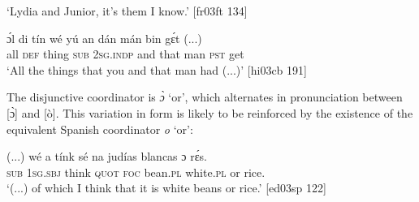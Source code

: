 \glt ‘Lydia and Junior, it’s them I know.’ [fr03ft 134]
\z


\ea%
    \label{ex:key:298}
    \gll ɔ́l  di  tín    wé  yú    an  dán  mán    bin  gɛ́t (...)\\
all  \textsc{def}  thing  \textsc{sub}  \textsc{2sg.indp}  and  that  man    \textsc{pst}  get\\

\glt ‘All the things that you and that man had (...)’ [hi03cb 191]
\z

The disjunctive coordinator is \textit{ɔ̀} ‘or’, which alternates in pronunciation between [ɔ̀] and [ò]. This variation in form is likely to be reinforced by the existence of the equivalent Spanish coordinator \textit{o} ‘or’:


\ea%
    \label{ex:key:299}
    \gll (...)  wé  a    tínk    sé    na  judías  blancas  ɔ  rɛ́s.\\
 {}  \textsc{sub}  \textsc{1sg.sbj}  think  \textsc{quot}    \textsc{foc}  bean.\textsc{pl}  white.\textsc{pl}  or  rice.\\

\glt ‘(...) of which I think that it is white beans or rice.’ [ed03sp 122]
\z

